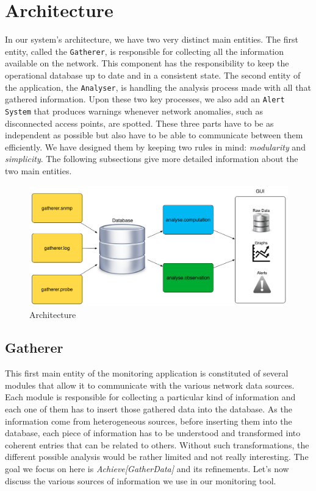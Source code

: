 \section{Architecture}
In our system's architecture, we have two very distinct main entities. The first entity, called the \texttt{Gatherer}, is responsible for collecting all the information available on the network. This component has the responsibility to keep the operational database up to date and in a consistent state. The second entity of the application, the \texttt{Analyser}, is handling the analysis process made with all that gathered information. Upon these two key processes, we also add an \texttt{Alert System} that produces warnings whenever network anomalies, such as disconnected access points, are spotted. These three parts have to be as independent as possible but also have to be able to communicate between them efficiently. We have designed them by keeping two rules in mind: \textit{modularity} and \textit{simplicity}. The following subsections give more detailed information about the two main entities.

\begin{figure}[H]
\centering
	\includegraphics[width=1.1\linewidth]{Pictures/chapter3/structure.png}
	\caption{Architecture}
\end{figure}


\subsection{Gatherer}
This first main entity of the monitoring application is constituted of several modules that allow it to communicate with the various network data sources. Each module is responsible for collecting a particular kind of information and each one of them has to insert those gathered data into the database. As the information come from heterogeneous sources, before inserting them into the database, each piece of information has to be understood and transformed into coherent entries that can be related to others. Without such transformations, the different possible analysis would be rather limited and not really interesting. The goal we focus on here is \textit{Achieve[GatherData]} and its refinements. Let's now discuss the various sources of information we use in our monitoring tool.

